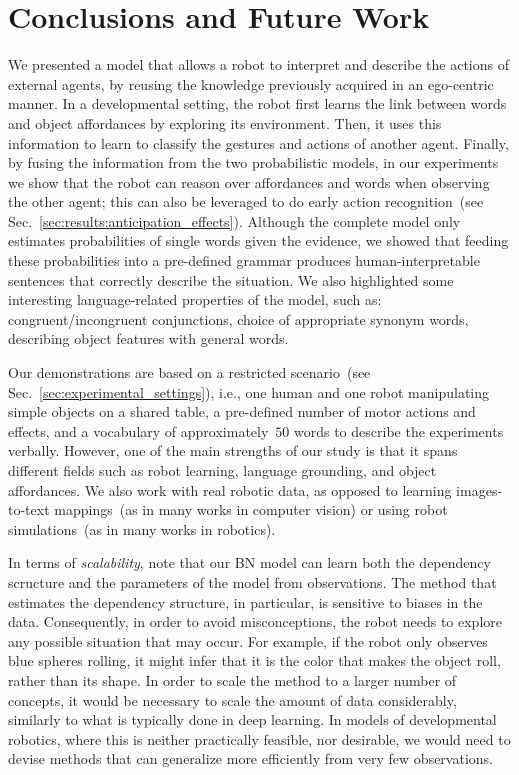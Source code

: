 
\section{Conclusions and Future Work}
\label{sec:conclusions}

We presented a model that allows a robot to interpret and describe the actions of external agents, by reusing the knowledge previously acquired in an ego-centric manner.
In a developmental setting, the robot first learns the link between words and object affordances by exploring its environment.
Then, it uses this information to learn to classify the gestures and actions of another agent.
Finally, by fusing the information from the two probabilistic models, in our experiments we show that the robot can reason over affordances and words when observing the other agent; this can also be leveraged to do early action recognition~(see Sec.~\ref{sec:results:anticipation_effects}).
Although the complete model only estimates probabilities of single words given the evidence, we showed that feeding these probabilities into a pre-defined grammar produces human-interpretable sentences that correctly describe the situation.
We also highlighted some interesting language-related properties of the model, such as:
congruent/incongruent conjunctions,
choice of appropriate synonym words,
describing object features with general words.

Our demonstrations are based on a restricted scenario~(see Sec.~\ref{sec:experimental_settings}), i.e., one human and one robot manipulating simple objects on a shared table, a pre-defined number of motor actions and effects, and a vocabulary of approximately~$50$ words to describe the experiments verbally.
However, one of the main strengths of our study is that it spans different fields such as robot learning, language grounding, and object affordances.
We also work with real robotic data, as opposed to learning images-to-text mappings~(as in many works in computer vision) or using robot simulations~(as in many works in robotics).

In terms of \emph{scalability}, note that our \ac{BN} model can learn both the dependency scructure and the parameters of the model from observations.
The method that estimates the dependency structure, in particular, is sensitive to biases in the data.
Consequently, in order to avoid misconceptions, the robot needs to explore any possible situation that may occur.
For example, if the robot only observes blue spheres rolling, it might infer that it is the color that makes the object roll, rather than its shape.
In order to scale the method to a larger number of concepts, it would be necessary to scale the amount of data considerably, similarly to what is typically done in deep learning.
In models of developmental robotics, where this is neither practically feasible, nor desirable, we would need to devise methods that can generalize more efficiently from very few observations.

